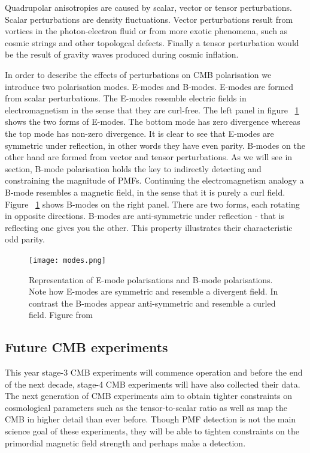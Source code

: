 Quadrupolar anisotropies are caused by scalar, vector or tensor perturbations. Scalar perturbations are density fluctuations. Vector perturbations result from vortices in the photon-electron fluid or from more exotic phenomena, such as cosmic strings and other topologcal defects. Finally a tensor perturbation would be the result of gravity waves produced during cosmic inflation.  

In order to describe the effects of perturbations on CMB polarisation we introduce two polarisation modes. E-modes and B-modes. E-modes are formed from scalar perturbations. The E-modes resemble electric fields in electromagnetism in the sense that they are curl-free. The left panel in figure ~\ref{fig:modes} shows the two forms of E-modes. The bottom mode has zero divergence whereas the top mode has non-zero divergence. It is clear to see that E-modes are symmetric under reflection, in other words they have even parity. B-modes on the other hand are formed from vector and tensor perturbations. As we will see in section, B-mode polarisation holds the key to indirectly detecting and constraining the magnitude of PMFs. Continuing the electromagnetism analogy a B-mode resembles a magnetic field, in the sense that it is purely a curl field. Figure ~\ref{fig:modes} shows B-modes on the right panel. There are two forms, each rotating in opposite directions. B-modes are anti-symmetric under reflection - that is reflecting one gives you the other. This property illustrates their characteristic odd parity.

\begin{figure}[h]
\centering
\texttt{[image: modes.png]}
\caption{Representation of E-mode polarisations and B-mode polarisations. Note how E-modes are symmetric and resemble a divergent field. In contrast the B-modes appear anti-symmetric and resemble a curled field. Figure from \citet{39087c288ce54d4bb9580169e1666880}}
\label{fig:modes}
\end{figure}

\subsection{Future CMB experiments}
This year stage-3 CMB experiments will commence operation and before the end of the next decade, stage-4 CMB experiments will have also collected their data. The next generation of CMB experiments aim to obtain tighter constraints on cosmological parameters such as the tensor-to-scalar ratio as well as map the CMB in higher detail than ever before. Though PMF detection is not the main science goal of these experiments, they will be able to tighten constraints on the primordial magnetic field strength and perhaps make a detection.

